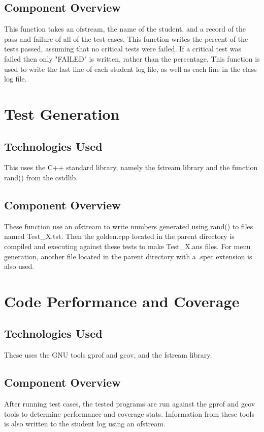 \subsection {Component Overview}
This function takes an ofstream, the name of the student, and a record of the pass and failure of all of the test cases.  
This function writes the percent of the tests passed, assuming that no critical tests were failed.  If a critical test was failed
then only "FAILED" is written, rather than the percentage.  This function is used to write the last line of each student log file,
as well as each line in the class log file.

\section{Test Generation}
\subsection {Technologies Used}
This uses the C++ standard library, namely the fstream library and the function rand() from the cstdlib.

\subsection {Component Overview}
These function use an ofstream to write numbers generated using rand() to files named Test\_X.tst. Then the golden.cpp located in the parent directory is compiled and executing against these tests to make Test\_X.ans files. For menu generation, another file located in the parent directory with a .spec extension is also used.

\section{Code Performance and Coverage}
\subsection {Technologies Used}
These uses the GNU tools gprof and gcov, and the fstream library.

\subsection {Component Overview}
After running test cases, the tested programs are run against the gprof and gcov tools to determine performance and coverage stats. Information from these tools is also written to the student log using an ofstream.


